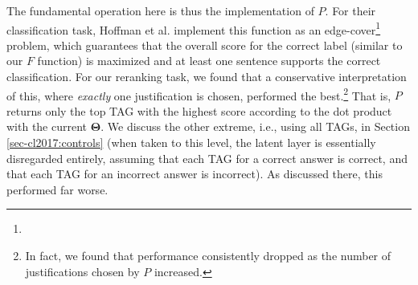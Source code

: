 The fundamental operation here is thus the implementation of $P$. For their classification task, Hoffman et al. implement this function as an edge-cover\footnote{
} problem, which guarantees that the overall score for the correct label (similar to our $F$ function) is maximized and at least one sentence supports the correct classification.  
For our reranking task, we found that a conservative interpretation of this, where {\em exactly} one justification is chosen, performed the best.\footnote{In fact, we found that performance consistently dropped as the number of justifications chosen by $P$ increased.} That is, $P$ returns only the top TAG with the highest score according to the dot product with the current $\boldsymbol{\Theta}$. 
We discuss the other extreme, i.e., using all TAGs, in Section \ref{sec-cl2017:controls} (when taken to this level, the latent layer is essentially disregarded entirely, assuming that each TAG for a correct answer is correct, and that each TAG for an incorrect answer is incorrect).  As discussed there, this performed far worse.


